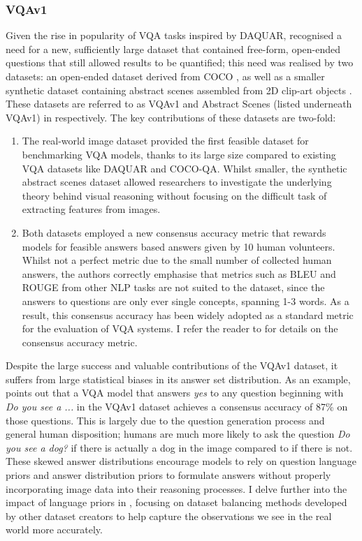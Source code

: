 \subsubsection{VQAv1}

Given the rise in popularity of VQA tasks inspired by DAQUAR, \citeauthor{antol2015vqa} recognised a need for a new, sufficiently large dataset that contained free-form, open-ended questions that still allowed results to be quantified; this need was realised by two datasets: an open-ended dataset derived from COCO \cite{lin2014microsoft}, as well as a smaller synthetic dataset containing abstract scenes assembled from 2D clip-art objects \cite{zitnick2013bringing}. These datasets are referred to as VQAv1 and Abstract Scenes (listed underneath VQAv1) in \tableautorefname{ \ref{tab:dataset_comparison}} respectively. The key contributions of these datasets are two-fold:

\begin{enumerate}
    \item The real-world image dataset provided the first feasible dataset for benchmarking VQA models, thanks to its large size compared to existing VQA datasets like DAQUAR and COCO-QA. Whilst smaller, the synthetic abstract scenes dataset allowed researchers to investigate the underlying theory behind visual reasoning without focusing on the difficult task of extracting features from images.
    \item Both datasets employed a new consensus accuracy metric that rewards models for feasible answers based answers given by 10 human volunteers. Whilst not a perfect metric due to the small number of collected human answers, the authors correctly emphasise that metrics such as BLEU and ROUGE from other NLP tasks are not suited to the dataset, since the answers to questions are only ever single concepts, spanning 1-3 words. As a result, this consensus accuracy has been widely adopted as a standard metric for the evaluation of VQA systems. I refer the reader to \subsectionautorefname{ \ref{subsection:consensus_measures}} for details on the consensus accuracy metric.
\end{enumerate}

Despite the large success and valuable contributions of the VQAv1 dataset, it suffers from large statistical biases in its answer set distribution. As an example, \cite{goyal2017making} points out that a VQA model that answers \textit{yes} to any question beginning with \textit{Do you see a ...} in the VQAv1 dataset achieves a consensus accuracy of 87\% on those questions. This is largely due to the question generation process and general human disposition; humans are much more likely to ask the question \textit{Do you see a dog?} if there is actually a dog in the image compared to if there is not. These skewed answer distributions encourage models to rely on question language priors and answer distribution priors to formulate answers without properly incorporating image data into their reasoning processes. I delve further into the impact of language priors in \subsectionautorefname{ \ref{subsec:lanauge_priors_in_vqa_datasets}}, focusing on dataset balancing methods developed by other dataset creators to help capture the observations we see in the real world more accurately.

